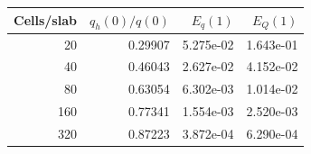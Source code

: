 \begin{tabular}{rrrr}
\toprule
Cells/slab & $q_h(0)/q(0)$ & $E_q(1)$ & $E_Q(1)$ \\
\midrule
20 & 0.29907 & 5.275e-02 & 1.643e-01 \\
40 & 0.46043 & 2.627e-02 & 4.152e-02 \\
80 & 0.63054 & 6.302e-03 & 1.014e-02 \\
160 & 0.77341 & 1.554e-03 & 2.520e-03 \\
320 & 0.87223 & 3.872e-04 & 6.290e-04 \\
\bottomrule
\end{tabular}
